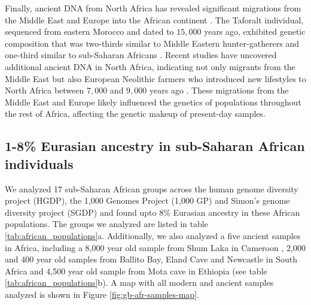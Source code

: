 Finally, ancient DNA from North Africa has revealed significant migrations from the Middle East and Europe into the African continent \cite{van2018pleistocene, fregel2018ancient, simoes2023northwest}.
%
The Taforalt individual, sequenced from eastern Morocco and dated to $15{,}000$ years ago, exhibited genetic composition that was two-thirds similar to Middle Eastern hunter-gatherers and one-third similar to sub-Saharan Africans \cite{van2018pleistocene}.
%
Recent studies have uncovered additional ancient DNA in North Africa, indicating not only migrants from the Middle East but also European Neolithic farmers who introduced new lifestyles to North Africa between $7{,}000$ and $9{,}000$ years ago \cite{fregel2018ancient, simoes2023northwest}. 
%
These migrations from the Middle East and Europe likely influenced the genetics of populations throughout the rest of Africa, affecting the genetic makeup of present-day samples.


\subsection{1-8\% Eurasian ancestry in sub-Saharan African individuals}

We analyzed 17 sub-Saharan African groups across the human genome diversity project (HGDP), the 1,000 Genomes Project (1,000 GP) and Simon's genome diversity project (SGDP) and found upto 8\% Eurasian ancestry in these African populations. The groups we analyzed are listed in table \ref{tab:african_populations}a. Additionally, we also analyzed a five ancient samples in Africa, including a 8,000 year old sample from Shum Laka in Cameroon \cite{lipson2020ancient}, 2,000 and 400 year old samples from Ballito Bay, Eland Cave and Newcastle in South Africa \cite{schlebusch2017southern} and 4,500 year old sample from Mota cave in Ethiopia \cite{llorente2015ancient} (see table \ref{tab:african_populations}b). A map with all modern and ancient samples analyzed is shown in Figure \ref{fig:gb-afr-samples-map}.


